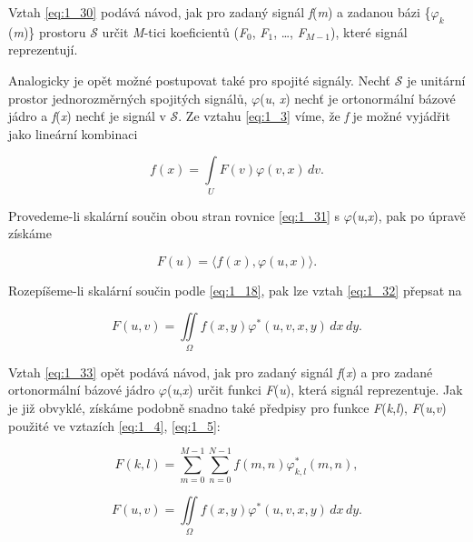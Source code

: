 Vztah \eqref{eq:1_30} podává návod, jak pro zadaný signál \textit{f}(\textit{m}) a zadanou bázi \{$\varphi_k$(\textit{m})\} prostoru $\mathscr{S}$ určit \textit{M}-tici koeficientů (\textit{F}$_0$, \textit{F}$_1$, \dots, \textit{F}$_{M-1}$), které signál reprezentují.

Analogicky je opět možné postupovat také pro spojité signály. Nechť $\mathscr{S}$ je unitární prostor jednorozměrných spojitých signálů, $\varphi$(\textit{u}, \textit{x}) nechť je ortonormální bázové jádro a \textit{f}(\textit{x}) nechť je signál v $\mathscr{S}$. Ze vztahu \eqref{eq:1_3} víme, že \textit{f} je možné vyjádřit jako lineární kombinaci

\begin{equation} \label{eq:1_31}
    f(x) = \int\limits_{U} F(v) \varphi(v, x)\, dv.
\end{equation}

Provedeme-li skalární součin obou stran rovnice \eqref{eq:1_31} s $\varphi$(\textit{u},\textit{x}), pak po úpravě získáme

\begin{equation} \label{eq:1_32}
    F(u) = \langle f(x), \varphi(u, x) \rangle.
\end{equation}

Rozepíšeme-li skalární součin podle \eqref{eq:1_18}, pak lze vztah \eqref{eq:1_32} přepsat na

\begin{equation} \label{eq:1_33}
    F(u, v) = \iint\limits_{\Omega} f(x, y) \varphi^*(u, v, x, y)\, dx\, dy.
\end{equation}

Vztah \eqref{eq:1_33} opět podává návod, jak pro zadaný signál \textit{f}(\textit{x}) a pro zadané ortonormální bázové jádro $\varphi$(\textit{u},\textit{x}) určit funkci \textit{F}(\textit{u}), která signál reprezentuje. Jak je již obvyklé, získáme podobně snadno také předpisy pro funkce \textit{F}(\textit{k},\textit{l}), \textit{F}(\textit{u},\textit{v}) použité ve vztazích \eqref{eq:1_4}, \eqref{eq:1_5}:

\begin{equation} \label{eq:1_34}
    F(k, l) = \sum\limits_{m=0}^{M-1} \sum\limits_{n=0}^{N-1} f(m, n) \varphi_{k, l}^*(m, n),
\end{equation}

\begin{equation} \label{eq:1_35}
    F(u, v) = \iint\limits_{\Omega} f(x, y) \varphi^*(u, v, x, y)\, dx\, dy.
\end{equation}

